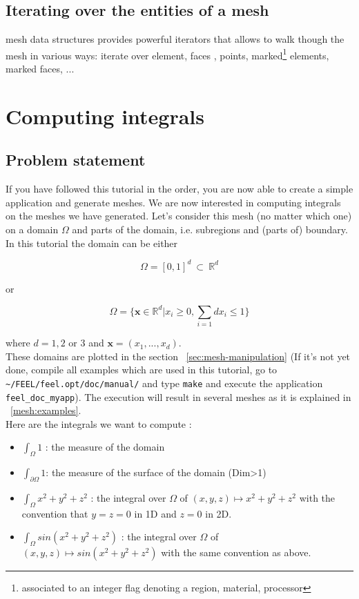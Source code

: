 \subsection{Iterating over the entities of a mesh}

\feel mesh data structures provides powerful iterators that allows to
walk though the mesh in various ways: iterate over element, faces ,
points, marked\footnote{associated to an integer flag denoting a
  region, material, processor} elements, marked faces, ...

\section{Computing integrals}
\label{sec:computing-integrals}

\subsection{Problem statement}

If you have followed this tutorial in the order, you are now able to create a simple application and generate meshes. We are now interested in computing integrals on the meshes we have generated. Let's consider this mesh (no matter which one) on a domain $\Omega$ and parts of the domain, i.e. subregions and (parts of) boundary. In this tutorial the domain can be either

\[ \Omega=[0,1]^d\ \subset\ \mathbb{R}^d \]

or

\[ \Omega=\{ \mathbf{x} \in \mathbb{R}^d | x_i \geq 0, \sum_{i=1}{d} x_i \leq 1 \} \]

where $ d=1,2$ or $3$ and $\mathbf{x}=(x_1,...,x_d)$.\\
These domains are plotted in the section ~\ref{sec:mesh-manipulation} (If it's not yet done, compile all examples which are used in this tutorial, go to \lstinline!~/FEEL/feel.opt/doc/manual/! and type \verb|make| and execute the application \verb|feel_doc_myapp|). The execution will result in several meshes as it is explained in ~\ref{mesh:examples}.\\
Here are the integrals we want to compute :
\begin{itemize}
\item $\displaystyle{ \int_\Omega 1 }$ : the measure of the domain
\item $\displaystyle{ \int_{\partial\Omega} 1 }$: the measure of the surface of the domain (Dim>1)
\item $ \displaystyle{\int_{\Omega} x^2+y^2+z^2 }$ : the integral over $\displaystyle{\Omega}$ of $ \displaystyle{(x,y,z) \mapsto x^2+y^2+z^2}$ with the convention that $y=z=0$ in 1D and $ z=0 $ in 2D.
\item $\displaystyle{ \int_{\Omega} sin(x^2+y^2+z^2)} $ : the integral over $\Omega$ of $\displaystyle{ (x,y,z) \mapsto sin(x^2+y^2+z^2)}$ with the same convention as above.
\end{itemize}

